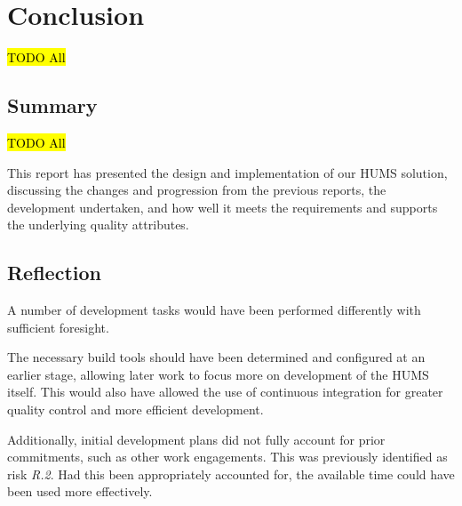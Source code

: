 \documentclass[10pt,a4paper]{article}
\begin{document}

\section{Conclusion}
\label{sec:conclusion}
\hl{TODO All}


\subsection{Summary}
\label{sec:summary}
\hl{TODO All}

This report has presented the design and implementation of our HUMS solution, discussing the changes and progression from the previous reports, the development undertaken, and how well it meets the requirements and supports the underlying quality attributes.


\subsection{Reflection}
\label{sec:reflection}


A number of development tasks would have been performed differently with sufficient foresight.

The necessary build tools should have been determined and configured at an earlier stage, allowing later work to focus more on development of the HUMS itself. This would also have allowed the use of continuous integration for greater quality control and more efficient development.

Additionally, initial development plans did not fully account for prior commitments, such as other work engagements. This was previously identified as risk \emph{R.2}. Had this been appropriately accounted for, the available time could have been used more effectively.
\end{document}
